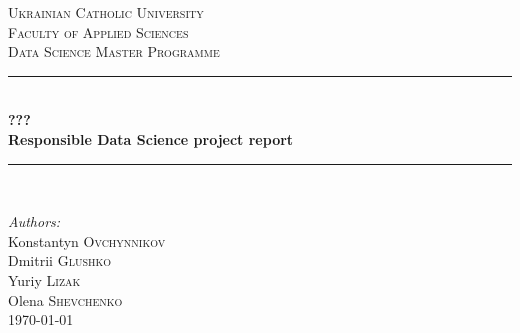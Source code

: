 \begin{titlepage}

\newcommand{\HRule}{\rule{\linewidth}{0.5mm}} %

\center %
 
\vspace*{0.5cm}
\textsc{\LARGE Ukrainian Catholic University}\\[1cm] %
\textsc{\Large  Faculty of Applied Sciences}\\[0.5cm] %
\textsc{\large Data Science Master Programme}\\[0.5cm] %

\vspace*{1.5cm}

\HRule \\[0.4cm]
{ \huge \bfseries ???}\\[10pt]
{\Large \bfseries Responsible Data Science project report}\\[0.4cm] %
\HRule \\[1cm]
 
\vspace*{2.5cm}

\Large \emph{Authors:}\\
Konstantyn  \textsc{Ovchynnikov}\\
Dmitrii \textsc{Glushko}\\
Yuriy \textsc{Lizak}\\
Olena \textsc{Shevchenko}\\[1cm] %

\vspace*{0.5cm}
{\large \today}\\[0.5cm] %


\end{titlepage}
